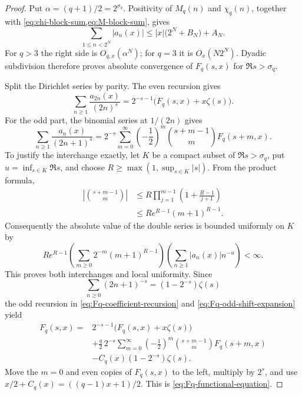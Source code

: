 \begin{proof}
Put $\alpha=(q+1)/2=2^{\sigma_q}$.  Positivity of $M_q(n)$ and
$\chi_q(n)$, together with \cref{eq:chi-block-sum,eq:M-block-sum}, gives
\[
 \sum_{1\leq n<2^N}|a_n(x)|
 \leq |x|\bigl(2^N+B_N\bigr)+A_N.
\]
For $q>3$ the right side is $O_{q,x}(\alpha^N)$; for $q=3$ it is
$O_x(N2^N)$.  Dyadic subdivision therefore proves absolute convergence of
$F_q(s,x)$ for $\Re s>\sigma_q$.

Split the Dirichlet series by parity.  The even recursion gives
\[
 \sum_{n\geq1}\frac{a_{2n}(x)}{(2n)^s}
 =2^{-s-1}\bigl(F_q(s,x)+x\zeta(s)\bigr).
\]
For the odd part, the binomial series at $1/(2n)$ gives
\begin{equation}
 \label{eq:Fq-odd-shift-expansion}
 \sum_{n\geq1}\frac{a_n(x)}{(2n+1)^s}
 =2^{-s}\sum_{m=0}^{\infty}\left(-\frac12\right)^m
   \binom{s+m-1}{m}F_q(s+m,x).
\end{equation}
To justify the interchange exactly, let $K$ be a compact subset of
$\Re s>\sigma_q$, put
$u=\inf_{s\in K}\Re s$, and choose
$R\geq\max(1,\sup_{s\in K}|s|)$.  From the product formula,
\begin{align*}
 \left|\binom{s+m-1}{m}\right|
 &\leq R\prod_{j=1}^{m-1}\left(1+\frac{R-1}{j+1}\right)\\
 &\leq Re^{R-1}(m+1)^{R-1}.
\end{align*}
Consequently the absolute value of the double series is bounded uniformly
on $K$ by
\[
 Re^{R-1}\left(\sum_{m\geq0}2^{-m}(m+1)^{R-1}\right)
 \left(\sum_{n\geq1}|a_n(x)|n^{-u}\right)<\infty.
\]
This proves both interchanges and local uniformity.  Since
\[
 \sum_{n\geq0}(2n+1)^{-s}=(1-2^{-s})\zeta(s)
\]
the odd recursion in \cref{eq:Fq-coefficient-recursion} and
\cref{eq:Fq-odd-shift-expansion} yield
\begin{align*}
 F_q(s,x)={}&2^{-s-1}\bigl(F_q(s,x)+x\zeta(s)\bigr)\\
 &+\frac q2\,2^{-s}\sum_{m=0}^{\infty}
 \left(-\frac12\right)^m\binom{s+m-1}{m}F_q(s+m,x)\\
 &-C_q(x)(1-2^{-s})\zeta(s).
\end{align*}
Move the $m=0$ and even copies of $F_q(s,x)$ to the left, multiply by
$2^s$, and use
$x/2+C_q(x)=((q-1)x+1)/2$.  This is
\cref{eq:Fq-functional-equation}.
\end{proof}

